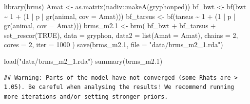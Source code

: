 \documentclass[
  12pt,
]{book}
\newenvironment{Shaded}{\begin{snugshade}}{\end{snugshade}}
\newcommand{\AttributeTok}[1]{\textcolor[rgb]{0.77,0.63,0.00}{#1}}
\newcommand{\ConstantTok}[1]{\textcolor[rgb]{0.00,0.00,0.00}{#1}}
\newcommand{\DecValTok}[1]{\textcolor[rgb]{0.00,0.00,0.81}{#1}}
\newcommand{\FloatTok}[1]{\textcolor[rgb]{0.00,0.00,0.81}{#1}}
\newcommand{\FunctionTok}[1]{\textcolor[rgb]{0.00,0.00,0.00}{#1}}
\newcommand{\NormalTok}[1]{#1}
\newcommand{\OtherTok}[1]{\textcolor[rgb]{0.56,0.35,0.01}{#1}}
\newcommand{\SpecialCharTok}[1]{\textcolor[rgb]{0.00,0.00,0.00}{#1}}
\newcommand{\StringTok}[1]{\textcolor[rgb]{0.31,0.60,0.02}{#1}}
\begin{document}
\begin{Shaded}
\begin{Highlighting}[]
\FunctionTok{library}\NormalTok{(brms)}
\NormalTok{Amat }\OtherTok{\textless{}{-}} \FunctionTok{as.matrix}\NormalTok{(nadiv}\SpecialCharTok{::}\FunctionTok{makeA}\NormalTok{(gryphonped))}
\NormalTok{bf\_bwt }\OtherTok{\textless{}{-}} \FunctionTok{bf}\NormalTok{(bwt }\SpecialCharTok{\textasciitilde{}} \DecValTok{1} \SpecialCharTok{+}\NormalTok{ (}\DecValTok{1} \SpecialCharTok{|}\NormalTok{ p }\SpecialCharTok{|} \FunctionTok{gr}\NormalTok{(animal, }\AttributeTok{cov =}\NormalTok{ Amat)))}
\NormalTok{bf\_tarsus }\OtherTok{\textless{}{-}} \FunctionTok{bf}\NormalTok{(tarsus }\SpecialCharTok{\textasciitilde{}} \DecValTok{1} \SpecialCharTok{+}\NormalTok{ (}\DecValTok{1} \SpecialCharTok{|}\NormalTok{ p }\SpecialCharTok{|} \FunctionTok{gr}\NormalTok{(animal, }\AttributeTok{cov =}\NormalTok{ Amat)))}
\NormalTok{brms\_m2}\FloatTok{.1} \OtherTok{\textless{}{-}} \FunctionTok{brm}\NormalTok{(}
\NormalTok{  bf\_bwt }\SpecialCharTok{+}\NormalTok{ bf\_tarsus }\SpecialCharTok{+} \FunctionTok{set\_rescor}\NormalTok{(}\ConstantTok{TRUE}\NormalTok{),}
  \AttributeTok{data =}\NormalTok{ gryphon,}
  \AttributeTok{data2 =} \FunctionTok{list}\NormalTok{(}\AttributeTok{Amat =}\NormalTok{ Amat),}
  \AttributeTok{chains =} \DecValTok{2}\NormalTok{, }\AttributeTok{cores =} \DecValTok{2}\NormalTok{, }\AttributeTok{iter =} \DecValTok{1000}
\NormalTok{)}
\FunctionTok{save}\NormalTok{(brms\_m2}\FloatTok{.1}\NormalTok{, }\AttributeTok{file =} \StringTok{"data/brms\_m2\_1.rda"}\NormalTok{)}
\end{Highlighting}
\end{Shaded}

\begin{Shaded}
\begin{Highlighting}[]
\FunctionTok{load}\NormalTok{(}\StringTok{"data/brms\_m2\_1.rda"}\NormalTok{)}
\FunctionTok{summary}\NormalTok{(brms\_m2}\FloatTok{.1}\NormalTok{)}
\end{Highlighting}
\end{Shaded}

\begin{verbatim}
## Warning: Parts of the model have not converged (some Rhats are > 1.05). Be careful when analysing the results! We recommend running more iterations and/or setting stronger priors.
\end{verbatim}
\end{document}
